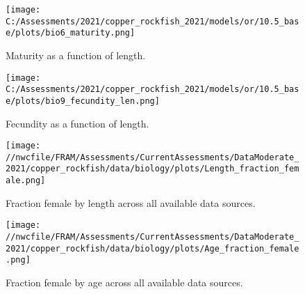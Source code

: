 \documentclass[11pt,
  english,
  a4paper,
]{article}
\begin{document}
\tagmcend\tagstructend

\clearpage


\begin{figure}
\centering
\texttt{[image: C:/Assessments/2021/copper\_rockfish\_2021/models/or/10.5\_base/plots/bio6\_maturity.png]}
\caption{Maturity as a function of length.\label{fig:maturity}}
\end{figure}

\tagmcend\tagstructend

\clearpage


\begin{figure}
\centering
\texttt{[image: C:/Assessments/2021/copper\_rockfish\_2021/models/or/10.5\_base/plots/bio9\_fecundity\_len.png]}
\caption{Fecundity as a function of length.\label{fig:fecundity}}
\end{figure}

\tagmcend\tagstructend

\clearpage


\begin{figure}
\centering
\texttt{[image: //nwcfile/FRAM/Assessments/CurrentAssessments/DataModerate\_2021/copper\_rockfish/data/biology/plots/Length\_fraction\_female.png]}
\caption{Fraction female by length across all available data sources.\label{fig:len-sex-ratio}}
\end{figure}

\tagmcend\tagstructend


\begin{figure}
\centering
\texttt{[image: //nwcfile/FRAM/Assessments/CurrentAssessments/DataModerate\_2021/copper\_rockfish/data/biology/plots/Age\_fraction\_female.png]}
\caption{Fraction female by age across all available data sources.\label{fig:age-sex-ratio}}
\end{figure}
\end{document}
